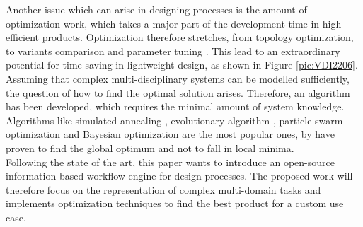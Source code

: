 Another issue which can arise in designing processes is the amount of optimization work, which takes a major part of the development time in high efficient products.
Optimization therefore stretches, from topology optimization, to variants comparison and parameter tuning \cite{hornby_automated_2006, khalafallah_electimize_2011, evans_aerodynamic_2017, slagter_perform_2020}. 
This lead to an extraordinary potential for time saving in lightweight design, as shown in Figure \ref{pic:VDI2206}.\\
Assuming that complex multi-disciplinary systems can be modelled sufficiently, the question of how to find the optimal solution arises.
Therefore, an algorithm has been developed, which requires the minimal amount of system knowledge.
Algorithms like simulated annealing \cite{khachaturyan_thermodynamic_1981}, 
evolutionary algorithm \cite{wu_ensemble_2019}, particle swarm optimization \cite{Kennedy1995} and Bayesian optimization \cite{marcuk_optimization_1975}
are the most popular ones, by have proven to find the global optimum and not to fall in local minima.\\
Following the state of the art, this paper wants to introduce an open-source information based workflow engine for design processes.
The proposed work will therefore focus on the representation of complex multi-domain tasks and implements optimization techniques to find the best product for a custom use case.